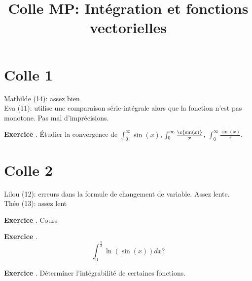 \documentclass[10pt,a4paper]{article}
\title{Colle MP: Intégration et fonctions vectorielles}
\newcounter{question}
\newcounter{exo}
\newenvironment{exo}{\vspace{0.5cm}\setcounter{question}{0}\addtocounter{exo}{1} \noindent \textbf{Exercice \theexo}. \normalsize }{\par}
\begin{document}
	\maketitle
	
	\section*{Colle 1}
	Mathilde (14): assez bien\\
	Eva (11): utilise une comparaison série-intégrale alors que la fonction n'est pas monotone. Pas mal d'imprécisions.

	\begin{exo}
		Étudier la convergence de $\int_{0}^{\infty} {\sin(x)}$, $\int_{0}^{\infty} \frac{\c{\sin(x)}}{x}$, $\int_{0}^{\infty} \frac{\sin(x)}{x}$.
	\end{exo}

	
	\section*{Colle 2}
	\setcounter{exo}{0}
	Lilou (12): erreurs dans la formule de changement de variable. Assez lente.\\
	Théo (13): assez lent\\

	\begin{exo}
		Cours
	\end{exo}

	\begin{exo}
		$$\int_{0}^{\frac{\pi}{2}} \ln(\sin(x))dx?$$
	\end{exo}

	\begin{exo}
		Déterminer l'intégrabilité de certaines fonctions.
	\end{exo}

\end{document}
